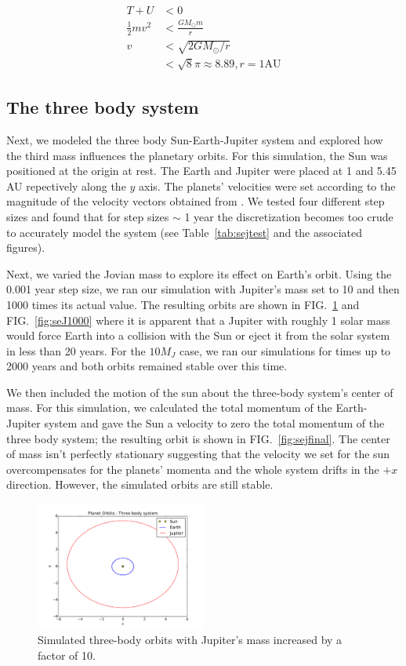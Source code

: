 \documentclass[10pt,showpacs,preprintnumbers,footinbib,amsmath,amssymb,aps,prl,twocolumn,groupedaddress,superscriptaddress,showkeys]{revtex4-1}
\begin{document}
\begin{align*}
	T + U &< 0\\
	\frac{1}{2} m v^2 &< \frac{ GM_{\odot} m}{r}\\
	v &< \sqrt{2GM_{\odot}/r}\\
	 &< \sqrt{8} \pi \approx 8.89, r=1 \mathrm{AU}
\end{align*}

\subsection*{The three body system}

Next, we modeled the three body Sun-Earth-Jupiter system and explored how
the third mass influences the planetary orbits. For this simulation, the Sun was
positioned at the origin at rest. The Earth and Jupiter were placed at 1 and 5.45
AU repectively along the $y$ axis. The planets' velocities were set according
to the magnitude of the velocity vectors obtained from \citep{nasa}. We tested
four different step sizes and found that for step sizes $\sim$ 1 year the discretization
becomes too crude to accurately model the system (see Table~\ref{tab:sejtest} and
the associated figures).

Next, we varied the Jovian mass to explore its effect on Earth's orbit. Using the
0.001 year step size, we ran our simulation with Jupiter's mass set to 10 and then 1000
times its actual value. The resulting orbits are shown in FIG.~\ref{fig:seJ10} and
FIG.~\ref{fig:seJ1000} where it is apparent that a Jupiter with roughly 1 solar mass would
force Earth into a collision with the Sun or eject it from the solar system in less than
20 years. For the $10M _J$ case, we ran our simulations for times up to 2000 years
and both orbits remained stable over this time.

We then included the motion of the sun about the three-body system's center
of mass. For this simulation, we calculated the total momentum of the Earth-
Jupiter system and gave the Sun a velocity to zero the total momentum of the
three body system; the resulting orbit is shown in FIG.~\ref{fig:sejfinal}. The
center of mass isn't perfectly stationary suggesting that the velocity we set for
the sun overcompensates for the planets' momenta and the whole system drifts
in the $+x$ direction. However, the simulated orbits are still stable.

\begin{figure}
\centering
	\includegraphics[width=0.5\textwidth]{figures/seJ10.pdf}
	\caption{Simulated three-body orbits with Jupiter's mass increased by a
	factor of 10.}
	\label{fig:seJ10}
\end{figure}
\end{document}
